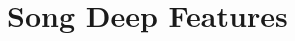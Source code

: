 
\chapter{Song Deep Features}

\label{AppendixA}

\begin{lstlisting}[caption=Song Deep Features]

\end{lstlisting}


